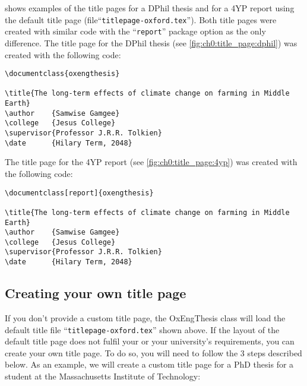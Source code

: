  shows examples of the title pages for a DPhil thesis and for a 4YP report using the default title page (file``\verb|titlepage-oxford.tex|''). Both title pages were created with similar code with the ``\verb|report|'' package option as the only difference. The title page for the DPhil thesis (see \cref{fig:ch0:title_page:dphil}) was created with the following code:


\begin{lstlisting}[style=custom-latex]
\documentclass{oxengthesis}

\title{The long-term effects of climate change on farming in Middle Earth}
\author    {Samwise Gamgee}
\college   {Jesus College}
\supervisor{Professor J.R.R. Tolkien}
\date      {Hilary Term, 2048}
\end{lstlisting}


\noindent The title page for the 4YP report (see \cref{fig:ch0:title_page:4yp}) was created with the following code:


\begin{lstlisting}[style=custom-latex]
\documentclass[report]{oxengthesis}

\title{The long-term effects of climate change on farming in Middle Earth}
\author    {Samwise Gamgee}
\college   {Jesus College}
\supervisor{Professor J.R.R. Tolkien}
\date      {Hilary Term, 2048}
\end{lstlisting}


\subsection{Creating your own title page}


If you don't provide a custom title page, the OxEngThesis class will load the default title file ``\verb|titlepage-oxford.tex|'' shown above. If the layout of the default title page does not fulfil your or your university's requirements, you can create your own title page. To do so, you will need to follow the 3 steps described below. As an example, we will create a custom title page for a PhD thesis for a student at the Massachusetts Institute of Technology:


